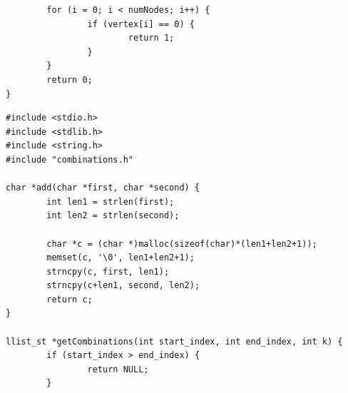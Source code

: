 \documentclass[11pt]{article}
\begin{document}
\begin{lstlisting}
        for (i = 0; i < numNodes; i++) {
                if (vertex[i] == 0) {
                        return 1;
                }
        }
        return 0;
}

\end{lstlisting}
\begin{lstlisting}
#include <stdio.h>
#include <stdlib.h>
#include <string.h>
#include "combinations.h"

char *add(char *first, char *second) {
        int len1 = strlen(first);
        int len2 = strlen(second);

        char *c = (char *)malloc(sizeof(char)*(len1+len2+1));
        memset(c, '\0', len1+len2+1);
        strncpy(c, first, len1);
        strncpy(c+len1, second, len2);
        return c;
}

llist_st *getCombinations(int start_index, int end_index, int k) {
        if (start_index > end_index) {
                return NULL;
        }


\end{lstlisting}
\end{document}
